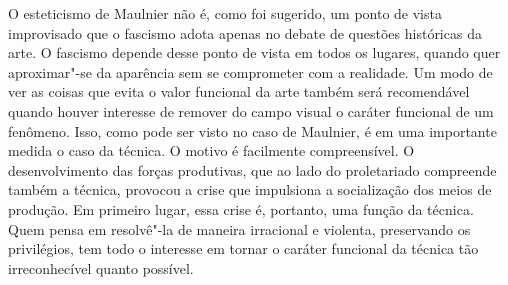 O esteticismo de Maulnier não é, como foi sugerido, um ponto de vista
improvisado que o fascismo adota apenas no debate de questões históricas
da arte. O fascismo depende desse ponto de vista em todos os lugares,
quando quer aproximar"-se da aparência sem se comprometer com a
realidade. Um modo de ver as coisas que evita o valor funcional da arte
também será recomendável quando houver interesse de remover do campo
visual o caráter funcional de um fenômeno. Isso, como pode ser visto no
caso de Maulnier, é em uma importante medida o caso da técnica. O motivo
é facilmente compreensível. O desenvolvimento das forças produtivas, que
ao lado do proletariado compreende também a técnica, provocou a crise
que impulsiona a socialização dos meios de produção. Em primeiro lugar,
essa crise é, portanto, uma função da técnica. Quem pensa em resolvê"-la
de maneira irracional e violenta, preservando os privilégios, tem todo o
interesse em tornar o caráter funcional da técnica tão irreconhecível
quanto possível.

